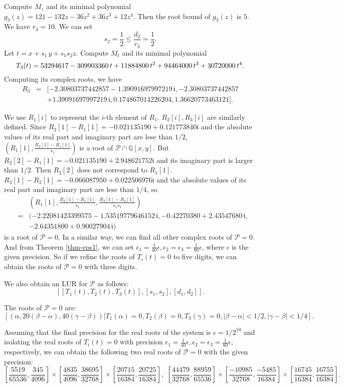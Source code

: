 \documentclass[amsthm]{JSC_LaTex_2007_Mar_12/elsart}
\def\Q{{\mathbb{Q}}}
\def\PS{ {\mathcal{P}} }
\begin{document}
\begin{exmp}
Compute $M_z$ and its minimal polynomial $g_3(z)=121-132 z-36 z^2+36
z^3+12 z^4$. Then the root bound of $g_3(z)$ is $5$. We have
$r_3=10$. We can set $$s_2=\frac{1}{2}\le
\frac{d_2}{r_3}=\frac{1}{2}.$$ Let $t=x+s_1\,y+s_1 s_2 z$. Compute
$M_t$ and its minimal polynomial
$$T_3(t)=53294617-309903360\,t\\+11884800\,t^2+94464000\,t^3+30720000\,t^4.$$
Computing its complex roots, we have
\begin{eqnarray*}
 R_3&=&[- 2.30803737442857- 1.39091697997219\,\mathfrak{i},- 2.30803737442857\\
 &&+1.39091697997219\,\mathfrak{i}, 0.174867014226204, 1.36620773463121].
\end{eqnarray*}

We use $R_1[i]$ to represent the $i$-th element of $R_1$. $R_2[i],
R_3[i]$ are similarly defined. Since
$R_2[1]-R_1[1]=-0.021135190+0.121773840 \mathfrak{i}$ and the
absolute values of its  real part and imaginary part are lese than
$1/2$, $(R_1[1],\frac{R_2[1]-R_1[1]}{s_1})$ is a root of
$\PS\cap\Q[x,y]$. But $R_2[2]-R_1[1]=-0.021135190+2.948621752
\mathfrak{i}$ and its imaginary part is larger than $1/2$. Then
$R_2[2]$ does not correspond to $R_1[1]$.
$R_3[1]-R_2[1]=-0.066087950+0.022506976 \mathfrak{i}$ and the
absolute values of its real part and imaginary part are lese than
$1/4$, so
\begin{eqnarray*}
&&(R_1[1], \frac{R_2[1]-R_1[1]}{s_1}, \frac{R_3[1]-R_2[1]}{s_1 s_2})\\
&=&(-2.22081423399575-1.53519779646152\, \mathfrak{i}, -0.42270380+2.43547680\, \mathfrak{i},\\
 &&-2.64351800+0.90027904\, \mathfrak{i})
\end{eqnarray*}
is a root of $\PS=0$. In a similar way, we can find all other
complex roots of $\PS=0$. And from Theorem \ref{thm-eps1}, we can
set $\epsilon_1=\frac{1}{40}\epsilon,
\epsilon_2=\epsilon_3=\frac{1}{80}\epsilon$, where $\epsilon$ is the
given precision. So if we refine the roots of $T_i(t)=0$ to five
digits, we can obtain the roots of $\PS=0$ with three digits.

We also obtain an LUR for $\mathcal{P}$ as follows:
$$[[T_1(t),T_2(t),T_3(t)],[s_1,s_2],[d_1,d_2]].$$

The roots of $\mathcal{P}=0$ are: $$[(
\alpha,20(\beta-\alpha),40(\gamma-\beta) )
|T_1(\alpha)=0,T_2(\beta)=0,T_3(\gamma)=0,|\beta-\alpha|<1/2,|\gamma-\beta|<1/4].$$

Assuming that the final precision for the real roots of the system
is $\epsilon=1/2^{10}$ and isolating the real roots of $T_i(t)=0$
with precision $\epsilon_1=\frac{1}{40}\epsilon,
\epsilon_2=\epsilon_3=\frac{1}{80}\epsilon$, respectively, we can
obtain the following two real roots of $\PS=0$ with the given
precision: {\footnotesize
$$[\frac{5519}{65536}, \frac{345}{4096}]\times[\frac{4835}{4096}, \frac{38695}{32768}]\times[\frac{20715}{16384}, \frac{20725}{16384}],\,\,[\frac{44479}{32768}, \frac{88959}{65536}]\times[\frac{-10985}{32768}, \frac{-5485}{16384}]\times[\frac{16745}{16384}, \frac{16755}{16384}].$$
}
\end{exmp}
\end{document}
